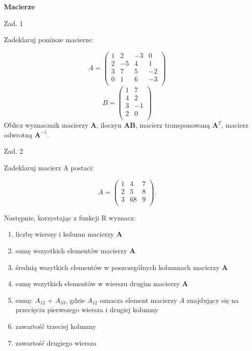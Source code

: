 \documentclass[12pt,B5paper,]{book}
\begin{document}
\textbf{Macierze}

Zad. 1

Zadeklaruj poniższe macierze:

\[A =
  \begin{pmatrix}
1 &  2 & -3&  0 \\ 
2 & -5 & 4 & 1 \\
3 & 7 & 5 & -2 \\
0 & 1&  6&  -3 \\
\end{pmatrix}
\] \[
  B =
  \begin{pmatrix}
1 & 7 \\
4 & 2 \\ 
3 & -1 \\ 
2 & 0 \\ 
\end{pmatrix}
\] Oblicz wyznacznik macierzy \(\textbf{A}\), iloczyn \(\textbf{AB}\),
macierz transponowaną \(\mathbf{A}^T\), macierz odwrotną
\(\mathbf{A}^{-1}\).

\vspace{0.8cm}

Zad. 2

Zadeklaruj macierz A postaci:

\[
  A =
  \begin{pmatrix}
1 & 4 & 7 \\
2 & 5 & 8 \\
3 & 68 & 9 \\
\end{pmatrix}.
\]

Następnie, korzystając z funkcji R wyznacz:

\begin{enumerate}
\def\labelenumi{\alph{enumi})}
\item
  liczbę wierszy i kolumn macierzy \(\textbf{A}\)
\item
  sumę wszystkich elementów macierzy \(\textbf{A}\)
\item
  średnią wszytkich elementów w poszczególnych kolumnach macierzy
  \(\textbf{A}\)
\item
  sumę wszytkich elementów w wierszu drugim macierzy \(\textbf{A}\)
\item
  sumę: \(A_{12}\) + \(A_{33}\), gdzie \(A_{12}\) oznacza element
  macierzy \(A\) znajdujący się na przecięciu pierwszego wiersza i
  drugiej kolumny
\item
  zawartość trzeciej kolumny
\item
  zawartość drugiego wiersza
\end{enumerate}
\end{document}
